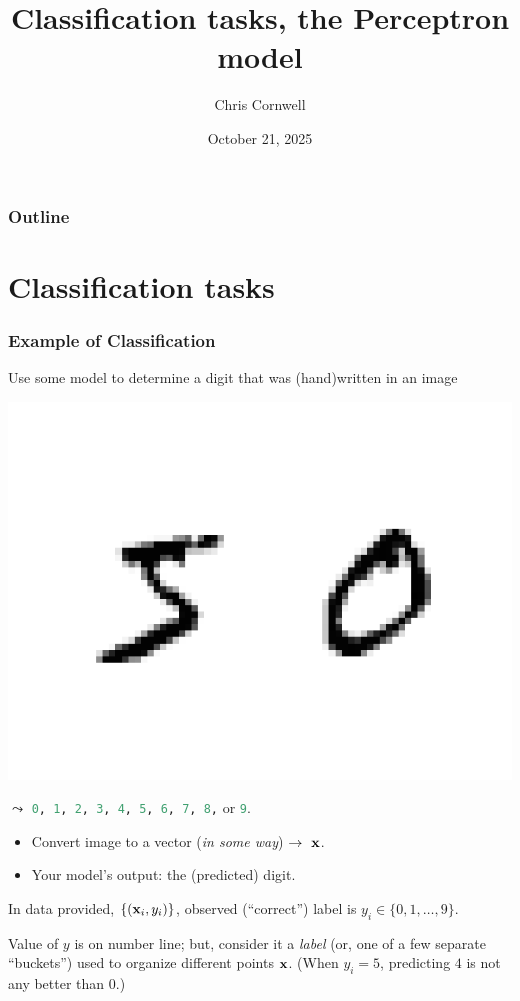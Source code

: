 \documentclass{beamer}
\author{Chris Cornwell}
\date{October 21, 2025}
\title{Classification tasks, the Perceptron model}
\theoremstyle{example}
\newcommand{\ct}[1]{\lstinline[language=Python,basicstyle=\ttfamily\footnotesize,stringstyle=\small\color{strings}]!#1!}
\begin{document}
\begin{frame}
\titlepage
\end{frame}

\begin{frame}
\frametitle{Outline}
\tableofcontents
\end{frame}

\section{Classification tasks}

\begin{frame}
\frametitle{Example of Classification}
Use some model to determine a digit that was (hand)written in an image
\begin{center}
\includegraphics[height=0.25\textheight]{../../Images/50.png}
\end{center}\vspace*{-8pt}

$\leadsto$ \hspace*{0.6in} \ct{0, 1, 2, 3, 4, 5, 6, 7, 8,} or \ct{9}.

\pause
\begin{itemize}
    \item Convert image to a vector (\textit{in some way}) $\to\ {\bf x}$.
    \item Your model's output: the (predicted) digit. 
\end{itemize}

\pause
In data provided, $\{({\bf x}_i, y_i)\}$, observed (``correct'') label is $y_i\in\{0,1,\ldots,9\}$.

\pause 
Value of $y$ is on number line; but, consider it a \emph{label} (or, one of a few separate ``buckets'') used to organize different points ${\bf x}$. (When $y_i=5$, predicting $4$ is not any better than $0$.)

\end{frame}
\end{document}
